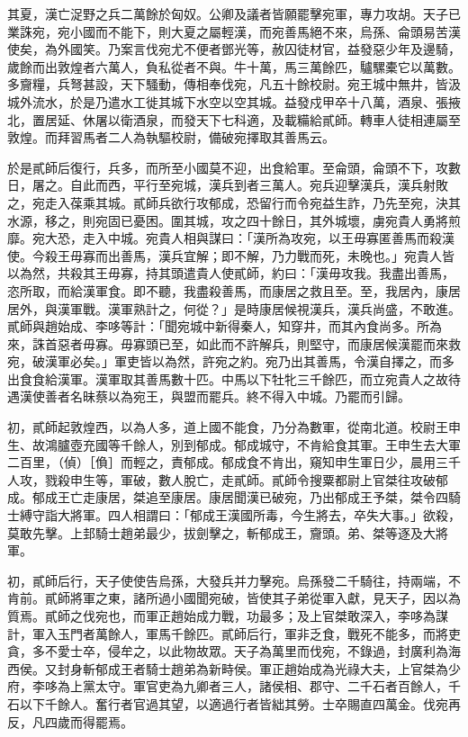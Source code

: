 \begin{pinyinscope}
其夏，漢亡浞野之兵二萬餘於匈奴。公卿及議者皆願罷擊宛軍，專力攻胡。天子已業誅宛，宛小國而不能下，則大夏之屬輕漢，而宛善馬絕不來，烏孫、侖頭易苦漢使矣，為外國笑。乃案言伐宛尤不便者鄧光等，赦囚徒材官，益發惡少年及邊騎，歲餘而出敦煌者六萬人，負私從者不與。牛十萬，馬三萬餘匹，驢騾橐它以萬數。多齎糧，兵弩甚設，天下騷動，傳相奉伐宛，凡五十餘校尉。宛王城中無井，皆汲城外流水，於是乃遣水工徙其城下水空以空其城。益發戍甲卒十八萬，酒泉、張掖北，置居延、休屠以衛酒泉，而發天下七科適，及載糒給貳師。轉車人徒相連屬至敦煌。而拜習馬者二人為執驅校尉，備破宛擇取其善馬云。

於是貳師后復行，兵多，而所至小國莫不迎，出食給軍。至侖頭，侖頭不下，攻數日，屠之。自此而西，平行至宛城，漢兵到者三萬人。宛兵迎擊漢兵，漢兵射敗之，宛走入葆乘其城。貳師兵欲行攻郁成，恐留行而令宛益生詐，乃先至宛，決其水源，移之，則宛固已憂困。圍其城，攻之四十餘日，其外城壞，虜宛貴人勇將煎靡。宛大恐，走入中城。宛貴人相與謀曰：「漢所為攻宛，以王毋寡匿善馬而殺漢使。今殺王毋寡而出善馬，漢兵宜解；即不解，乃力戰而死，未晚也。」宛貴人皆以為然，共殺其王毋寡，持其頭遣貴人使貳師，約曰：「漢毋攻我。我盡出善馬，恣所取，而給漢軍食。即不聽，我盡殺善馬，而康居之救且至。至，我居內，康居居外，與漢軍戰。漢軍熟計之，何從？」是時康居候視漢兵，漢兵尚盛，不敢進。貳師與趙始成、李哆等計：「聞宛城中新得秦人，知穿井，而其內食尚多。所為來，誅首惡者毋寡。毋寡頭已至，如此而不許解兵，則堅守，而康居候漢罷而來救宛，破漢軍必矣。」軍吏皆以為然，許宛之約。宛乃出其善馬，令漢自擇之，而多出食食給漢軍。漢軍取其善馬數十匹。中馬以下牡牝三千餘匹，而立宛貴人之故待遇漢使善者名昧蔡以為宛王，與盟而罷兵。終不得入中城。乃罷而引歸。

初，貳師起敦煌西，以為人多，道上國不能食，乃分為數軍，從南北道。校尉王申生、故鴻臚壺充國等千餘人，別到郁成。郁成城守，不肯給食其軍。王申生去大軍二百里，（偵）［偩］而輕之，責郁成。郁成食不肯出，窺知申生軍日少，晨用三千人攻，戮殺申生等，軍破，數人脫亡，走貳師。貳師令搜粟都尉上官桀往攻破郁成。郁成王亡走康居，桀追至康居。康居聞漢已破宛，乃出郁成王予桀，桀令四騎士縛守詣大將軍。四人相謂曰：「郁成王漢國所毒，今生將去，卒失大事。」欲殺，莫敢先擊。上邽騎士趙弟最少，拔劍擊之，斬郁成王，齎頭。弟、桀等逐及大將軍。

初，貳師后行，天子使使告烏孫，大發兵并力擊宛。烏孫發二千騎往，持兩端，不肯前。貳師將軍之東，諸所過小國聞宛破，皆使其子弟從軍入獻，見天子，因以為質焉。貳師之伐宛也，而軍正趙始成力戰，功最多；及上官桀敢深入，李哆為謀計，軍入玉門者萬餘人，軍馬千餘匹。貳師后行，軍非乏食，戰死不能多，而將吏貪，多不愛士卒，侵牟之，以此物故眾。天子為萬里而伐宛，不錄過，封廣利為海西侯。又封身斬郁成王者騎士趙弟為新畤侯。軍正趙始成為光祿大夫，上官桀為少府，李哆為上黨太守。軍官吏為九卿者三人，諸侯相、郡守、二千石者百餘人，千石以下千餘人。奮行者官過其望，以適過行者皆絀其勞。士卒賜直四萬金。伐宛再反，凡四歲而得罷焉。


\end{pinyinscope}
